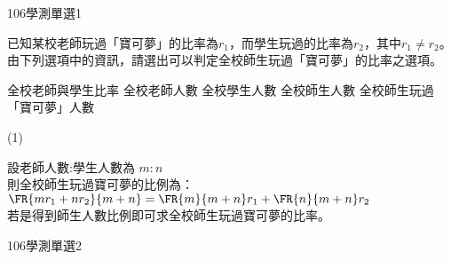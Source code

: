 \begin{QUESTIONS}
    \begin{QUESTION}
        \begin{ExamInfo}{106}{學測}{單選}{1}
        \end{ExamInfo}
        \begin{ExamAnsRateInfo}{53}{82}{52}{25}
        \end{ExamAnsRateInfo}
        \begin{QBODY}
            已知某校老師玩過「寶可夢」的比率為${{r}_{1}}$，而學生玩過的比率為${{r}_{2}}$，其中${{r}_{1}}\ne {{r}_{2}}$。
            由下列選項中的資訊，請選出可以判定全校師生玩過「寶可夢」的比率之選項。
            \begin{QOPS}
                \QOP 全校老師與學生比率     
                \QOP 全校老師人數
                \QOP 全校學生人數
                \QOP 全校師生人數
                \QOP 全校師生玩過「寶可夢」人數
            \end{QOPS}
        \end{QBODY}
        \begin{QFROMS}
        \end{QFROMS}
        \begin{QTAGS}\end{QTAGS}
        \begin{QANS}
            (1)
        \end{QANS}
        \begin{QSOLLIST}
            \begin{QSOL}
                設老師人數:學生人數為 $m:n$\\
                則全校師生玩過寶可夢的比例為：$\FR{m r_1 + n r_2}{m+n} = \FR{m}{m+n} r_1 +\FR{n}{m+n} r_2$\\
                若是得到師生人數比例即可求全校師生玩過寶可夢的比率。
            \end{QSOL}
        \end{QSOLLIST}
        \begin{QEMPTYSPACE}
        \end{QEMPTYSPACE}
    \end{QUESTION}
    \begin{QUESTION}
        \begin{ExamInfo}{106}{學測}{單選}{2}
        \end{ExamInfo}
        \begin{ExamAnsRateInfo}{51}{84}{52}{17}

\end{ExamAnsRateInfo}
\end{QUESTION}
\end{QUESTIONS}
